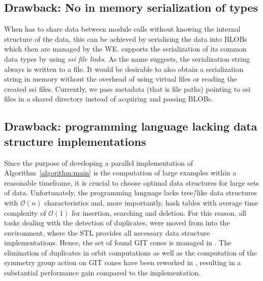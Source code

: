 \subsection*{Drawback: No in memory serialization of \singular{} types}
When \gpispace{} has to share \singular{} data between module calls without knowing the internal structure of the data, this can be achieved by serialising the data into \acp{BLOB} which then are managed by the \ac{WE}. \singular{} supports the serialization of its common data types by using \emph{\ac{ssi} file links}. As the name suggests, the serialization string always is written to a file. It would be desirable to also obtain a serialization string in memory without the overhead of using virtual files or reading the created \ac{ssi} files. Currently, we pass metadata (that is file paths) pointing to \ac{ssi} files in a shared directory instead of acquiring and passing \acp{BLOB}.

\subsection*{Drawback: \singular{} programming language lacking data structure implementations}
Since the purpose of developing a parallel implementation of Algorithm~\ref{algorithm:main} is the computation of large examples within a reasonable timeframe, it is crucial to choose optimal data structures for large sets of data. Unfortunately, the \singular{} programming language lacks tree\=/like data structures with $\mathcal{O}(n)$ characteristics and, more importantly, hash tables with average time complexity of $\mathcal{O}(1)$ for insertion, searching and deletion. For this reason, all tasks dealing with the detection of duplicates, were moved from \singular{} into the \cplusplus{} environment, where the \ac{STL} provides all necessary data structure implementations. Hence, the set of found GIT cones is managed in \cplusplus{}. The elimination of duplicates in orbit computations as well as the computation of the symmetry group action on GIT cones have been reworked in \cplusplus{}, resulting in a substantial performance gain compared to the \gitfanlib{} implementation.


